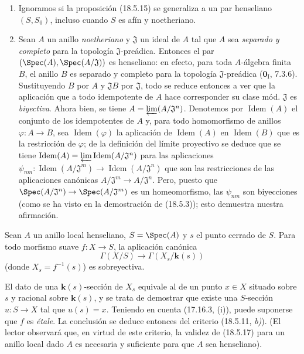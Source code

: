 \begin{remarks}[18.5.16]
\label{IV.18.5.16}
\begin{enumerate}
  \item[(i)] Ignoramos si la proposición (18.5.15) se generaliza a un par henseliano $(S,S_0)$, incluso cuando $S$ es afín y noetheriano.
  \item[(ii)] Sean $A$ un anillo \emph{noetheriano} y $\mathfrak J$ un ideal de $A$ tal que $A$ sea \emph{separado y completo} para la topología $\mathfrak J$-preádica. Entonces el par $(\Spec(A),\Spec(A/\mathfrak J))$ es henseliano: en efecto, para toda $A$-álgebra finita $B$, el anillo $B$ es separado y completo para la topología $\mathfrak J$-preádica ($\mathbf{0}_{\mathrm I}$, 7.3.6). Sustituyendo $B$ por $A$ y $\mathfrak J B$ por $\mathfrak J$, todo se reduce entonces a ver que la aplicación que a todo idempotente de $A$ hace corresponder su clase mód. $\mathfrak J$ es \emph{biyectiva}. Ahora bien, se tiene $A=\varprojlim (A/\mathfrak J^n)$. Denotemos por $\operatorname{Idem}(A)$ el conjunto de los idempotentes de $A$ y, para todo homomorfismo de anillos $\varphi:A\to B$, sea $\operatorname{Idem}(\varphi)$ la aplicación de $\operatorname{Idem}(A)$ en $\operatorname{Idem}(B)$ que es la restricción de $\varphi$; de la definición del límite proyectivo se deduce que se tiene
  $\operatorname{Idem}(A)=\varprojlim\operatorname{Idem}(A/\mathfrak J^n)$
  para las aplicaciones $\psi_{nm}:\operatorname{Idem}(A/\mathfrak J^m)\to\operatorname{Idem}(A/\mathfrak J^n)$ que son las restricciones de las aplicaciones canónicas $A/\mathfrak J^m\to A/\mathfrak J^n$. Pero, puesto que $\Spec(A/\mathfrak J^n)\to\Spec(A/\mathfrak J^m)$ es un homeomorfismo, las $\psi_{nm}$ son biyecciones (como se ha visto en la demostración de (18.5.3)); esto demuestra nuestra afirmación.
\end{enumerate}
\end{remarks}

\begin{theorem}[18.5.17]
\label{IV.18.5.17}
Sean $A$ un anillo local henseliano, $S=\Spec(A)$ y $s$ el punto cerrado de $S$. Para todo morfismo suave $f:X\to S$, la aplicación canónica
\[
  \Gamma(X/S)\longrightarrow\Gamma(X_s/\boldsymbol{k}(s))
\]
\textup{(}donde $X_s=f^{-1}(s)$\textup{)} es sobreyectiva.
\end{theorem}

El dato de una $\boldsymbol{k}(s)$-sección de $X_s$ equivale al de un punto $x\in X$ situado sobre $s$ y racional sobre $\boldsymbol{k}(s)$, y se trata de demostrar que existe una $S$-sección $u:S\to X$ tal que $u(s)=x$. Teniendo en cuenta (17.16.3, (i)), puede suponerse que $f$ es \emph{étale}. La conclusión se deduce entonces del criterio (18.5.11, \emph{b)}). (El lector observará que, en virtud de este criterio, la validez de (18.5.17) para un anillo local dado $A$ es necesaria y suficiente para que $A$ sea henseliano).

